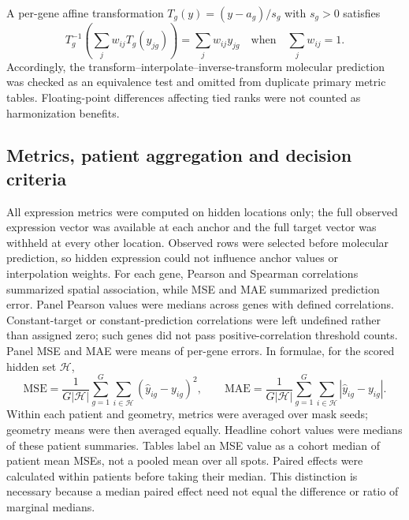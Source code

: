 A per-gene affine transformation $T_g(y)=(y-a_g)/s_g$ with $s_g>0$ satisfies
\begin{equation}
 T_g^{-1}\!\left(\sum_jw_{ij}T_g(y_{jg})\right)=\sum_jw_{ij}y_{jg}
 \quad\text{when}\quad\sum_jw_{ij}=1.
 \label{eq:affine}
\end{equation}
Accordingly, the transform--interpolate--inverse-transform molecular prediction was checked as an equivalence test and omitted from duplicate primary metric tables. Floating-point differences affecting tied ranks were not counted as harmonization benefits.

\subsection{Metrics, patient aggregation and decision criteria}
All expression metrics were computed on hidden locations only; the full observed expression vector was available at each anchor and the full target vector was withheld at every other location. Observed rows were selected before molecular prediction, so hidden expression could not influence anchor values or interpolation weights. For each gene, Pearson and Spearman correlations summarized spatial association, while MSE and MAE summarized prediction error. Panel Pearson values were medians across genes with defined correlations. Constant-target or constant-prediction correlations were left undefined rather than assigned zero; such genes did not pass positive-correlation threshold counts. Panel MSE and MAE were means of per-gene errors. In formulae, for the scored hidden set $\mathcal H$,
\begin{equation}
 \mathrm{MSE}=\frac{1}{G|\mathcal H|}\sum_{g=1}^{G}\sum_{i\in\mathcal H}(\widehat y_{ig}-y_{ig})^2,\qquad
 \mathrm{MAE}=\frac{1}{G|\mathcal H|}\sum_{g=1}^{G}\sum_{i\in\mathcal H}|\widehat y_{ig}-y_{ig}|.
 \label{eq:errors}
\end{equation}
Within each patient and geometry, metrics were averaged over mask seeds; geometry means were then averaged equally. Headline cohort values were medians of these patient summaries. Tables label an MSE value as a cohort median of patient mean MSEs, not a pooled mean over all spots. Paired effects were calculated within patients before taking their median. This distinction is necessary because a median paired effect need not equal the difference or ratio of marginal medians.

